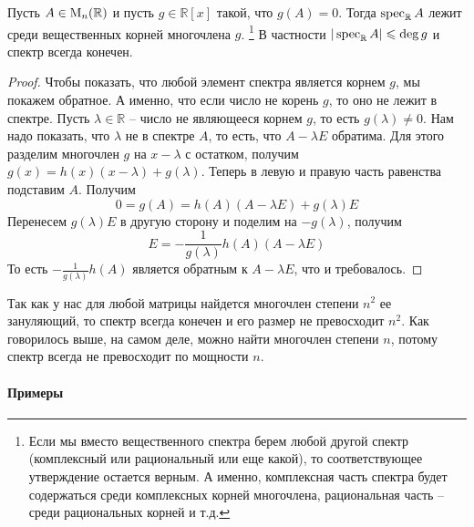 \begin{claim}
\label{claim::SpecInRoots}
Пусть $A\in\operatorname{M}_{n}(\mathbb R)$ и пусть $g\in\mathbb R[x]$ такой, что $g(A) = 0$.
Тогда $\operatorname{spec}_\mathbb R A$ лежит среди вещественных корней многочлена $g$.%
\footnote{Если мы вместо вещественного спектра берем любой другой спектр (комплексный или рациональный или еще какой), то соответствующее утверждение остается верным.
А именно, комплексная часть спектра будет содержаться среди комплексных корней многочлена, рациональная часть -- среди рациональных корней и т.д.}
В частности $|\operatorname{spec}_\mathbb R A|\leqslant \deg g$ и спектр всегда конечен.
\end{claim}
\begin{proof}
Чтобы показать, что любой элемент спектра является корнем $g$, мы покажем обратное.
А именно, что если число не корень $g$, то оно не лежит в спектре.
Пусть $\lambda\in \mathbb R$ -- число не являющееся корнем $g$, то есть $g(\lambda) \neq 0$.
Нам надо показать, что $\lambda$ не в спектре $A$, то есть, что $A - \lambda E$ обратима.
Для этого разделим многочлен $g$ на $x - \lambda$ с остатком, получим $g(x) = h(x) (x-\lambda) + g(\lambda)$.
Теперь в левую и правую часть равенства подставим $A$.
Получим 
\[
0 = g(A) = h(A)(A - \lambda E) + g(\lambda)E
\]
Перенесем $g(\lambda)E$ в другую сторону и поделим на $-g(\lambda)$, получим
\[
E = -\frac{1}{g(\lambda)}h(A)(A-\lambda E)
\]
То есть $-\frac{1}{g(\lambda)}h(A)$ является обратным к $A-\lambda E$, что и требовалось.
\end{proof}

Так как у нас для любой матрицы найдется многочлен степени $n^2$ ее зануляющий, то спектр всегда конечен и его размер не превосходит $n^2$.
Как говорилось выше, на самом деле, можно найти многочлен степени $n$, потому спектр всегда не превосходит по мощности $n$.

\paragraph{Примеры}

